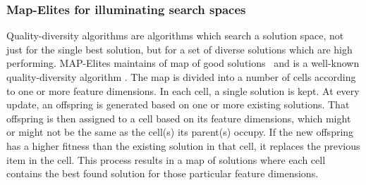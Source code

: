
\subsubsection{Map-Elites for illuminating search spaces}

Quality-diversity algorithms are algorithms which search a %
solution space, not just for the single best solution, but for a set of diverse solutions which are high performing. MAP-Elites maintains of map of good solutions~\cite{p6Mouret2015} and is a well-known quality-diversity algorithm%
. The map is divided into a number of cells according to one or more feature dimensions. In each cell, a single solution is kept. At every update, an offspring is generated based on one or more existing solutions. That offspring     is then assigned to a cell based on its feature dimensions, which might or might not be the same as the cell(s) its parent(s) occupy. %
If the new offspring has a higher fitness than the existing solution in that cell, it replaces the previous item in the cell. This process results in a map of solutions where each cell contains the best found solution for those particular feature dimensions.

